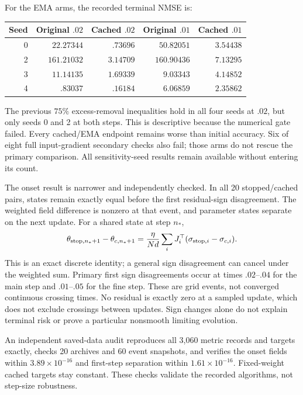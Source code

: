 \documentclass[11pt,a4paper]{article}
\begin{document}
For the EMA arms, the recorded terminal NMSE is:
\begin{center}
\begin{tabular}{rrrrr}
Seed & Original $.02$ & Cached $.02$ & Original $.01$ & Cached $.01$\\ \hline
0 & $22.27344$ & $.73696$ & $50.82051$ & $3.54438$\\
2 & $161.21032$ & $3.14709$ & $160.90436$ & $7.13295$\\
3 & $11.14135$ & $1.69339$ & $9.03343$ & $4.14852$\\
4 & $.83037$ & $.16184$ & $6.06859$ & $2.35862$
\end{tabular}
\end{center}
The previous $75\%$ excess-removal inequalities hold in all four seeds
at $.02$, but only seeds 0 and 2 at both steps. This is descriptive
because the numerical gate failed. Every cached/EMA endpoint remains
worse than initial accuracy. Six of eight full input-gradient secondary
checks also fail; those arms do not rescue the primary comparison.
All sensitivity-seed results remain available without entering its count.

The onset result is narrower and independently checked. In all 20
stopped/cached pairs, states remain exactly equal before the first
residual-sign disagreement. The weighted field difference is nonzero
at that event, and parameter states separate on the next update.
For a shared state at step $n_*$,
\[
 \theta_{{\rm stop},n_*+1}-\theta_{c,n_*+1}
 =\frac{\eta}{Nd}\sum_i J_i^\top
       (\sigma_{{\rm stop},i}-\sigma_{c,i}).
\]
This is an exact discrete identity; a general sign disagreement can
cancel under the weighted sum. Primary first sign disagreements occur
at times $.02$--$.04$ for the main step and $.01$--$.05$ for the fine
step. These are grid events, not converged continuous crossing times.
No residual is exactly zero at a sampled update, which does not exclude
crossings between updates. Sign changes alone do not explain terminal
risk or prove a particular nonsmooth limiting evolution.

An independent saved-data audit reproduces all 3,060 metric records and
targets exactly, checks 20 archives and 60 event snapshots, and verifies
the onset fields within $3.89\times10^{-16}$ and first-step separation
within $1.61\times10^{-16}$. Fixed-weight cached targets stay constant.
These checks validate the recorded algorithms, not step-size robustness.
\end{document}
